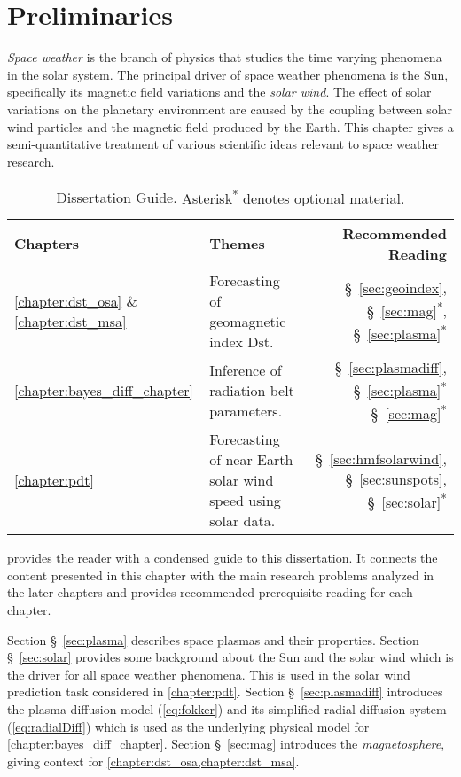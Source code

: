 \chapter{Preliminaries}\label{chapter:preliminaries}

\emph{Space weather} is the branch of physics that studies the time varying phenomena in the solar 
system. The principal driver of space weather phenomena is the Sun, specifically its magnetic field 
variations and the \emph{solar wind}. The effect of solar variations on the planetary environment 
are caused by the coupling between solar wind particles and the magnetic field produced by the 
Earth. This chapter gives a semi-quantitative treatment of various scientific ideas relevant to 
space weather research.

\begin{table}
    \centering
    \begin{tabular}{l p{} r}
        \hline
        \textbf{Chapters} & \textbf{Themes} & \textbf{Recommended Reading}\\
        \hline
        \vspace{5pt}
        \ref{chapter:dst_osa} \& \ref{chapter:dst_msa} & Forecasting of geomagnetic index $\mathrm{Dst}$. & \S~\ref{sec:geoindex}, \S~\ref{sec:mag}\textsuperscript{*}, \S~\ref{sec:plasma}\textsuperscript{*} \\
        \ref{chapter:bayes_diff_chapter} & Inference of radiation belt parameters. & \S~\ref{sec:plasmadiff}, \S~\ref{sec:plasma}\textsuperscript{*} \S~\ref{sec:mag}\textsuperscript{*} \\
        \ref{chapter:pdt} & Forecasting of near Earth solar wind speed using solar data. & \S~\ref{sec:hmfsolarwind}, \S~\ref{sec:sunspots}, \S~\ref{sec:solar}\textsuperscript{*}\\
        \hline
    \end{tabular}
    \caption{Dissertation Guide. {\small Asterisk\textsuperscript{*} denotes optional material.}}
    \label{table:chapterguide}
\end{table}

 provides the reader with a condensed guide to this dissertation. 
It connects the content presented in this chapter with the main research problems analyzed in the 
later chapters and provides recommended prerequisite reading for each chapter.

Section \S~\ref{sec:plasma} describes space plasmas and their properties. Section 
\S~\ref{sec:solar} provides some background about the Sun and the solar wind which is the driver 
for all space weather phenomena. This is used in the solar wind prediction task considered in 
\cref{chapter:pdt}. Section \S~\ref{sec:plasmadiff} introduces the plasma diffusion model 
(\cref{eq:fokker}) and its simplified radial diffusion system (\cref{eq:radialDiff}) which is 
used as the underlying physical model for \cref{chapter:bayes_diff_chapter}. Section 
\S~\ref{sec:mag} introduces the \emph{magnetosphere}, giving context for 
\cref{chapter:dst_osa,chapter:dst_msa}. 


